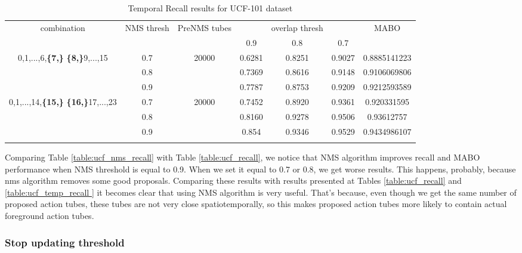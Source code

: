 \newpage
\begin{center}
  \setlength{\tabcolsep}{2.2pt}
\begin{longtable}{||c | c | c | c c c| c|}

  \hline
  \multirow{2}{*}{combination} & \multirow{2}{2.5em}{NMS thresh} & \multirow{2}{3.5em}{PreNMS tubes} &  {} &overlap thresh & {} & \multirow{2}{*}{MABO} \\
  {} & {} & {} &  0.9 &  0.8 & 0.7 & {}\\         
  \hline
  \multirow{3}{7em}{0,1,...,6,\textbf{\{7,\}}
  \textbf{\{8,\}}9,...,15 }  & 0.7 &\multirow{3}{*}{20000}  & 0.6281 & 0.8251 & 0.9027 & 0.8885141223  \\
  \cline{2-2} \cline{4-7} 
  {} &  0.8   & {}   & 0.7369 & 0.8616 & 0.9148 & 0.9106069806 \\
  \cline{2-2} \cline{4-7} 
  {} &  0.9   & {}   &  0.7787 & 0.8753 & 0.9209 & 0.9212593589 \\
  \hline                                    
  \multirow{3}{7em}{0,1,...,14,\textbf{\{15,\}}
  \textbf{\{16,\}}17,...,23 }  & 0.7 & \multirow{3}{*}{20000}   & 0.7452 & 0.8920 & 0.9361 & 0.920331595 \\
  \cline{2-2} \cline{4-7} 
  {} &  0.8   & {}   & 0.8160 & 0.9278 & 0.9506 & 0.93612757 \\
  \cline{2-2} \cline{4-7} 
  {} &  0.9   & {}   & 0.854 & 0.9346 & 0.9529 & 0.9434986107 \\
  \hline                                    

  \caption{Temporal Recall results for UCF-101 dataset}
  \label{table:ucf_nms_temp_recall}
\end{longtable} 
\end{center}

Comparing Table \ref{table:ucf_nms_recall} with Table \ref{table:ucf_recall},  we notice that NMS algorithm improves recall and MABO
performance when NMS threshold is equal to 0.9. When we set it equal to 0.7 or 0.8, we get worse results. This happens, probably, because
nms algorithm removes some good proposals. Comparing these results with results presented at Tables \ref{table:ucf_recall} and \ref{table:ucf_temp_recall } it becomes clear that using NMS algorithm is very useful. That's because, even though we get the same number of proposed action tubes,
these tubes are not very close spatiotemporally, so this makes proposed action tubes more likely to contain actual foreground action tubes.

\subsubsection{Stop updating threshold}

